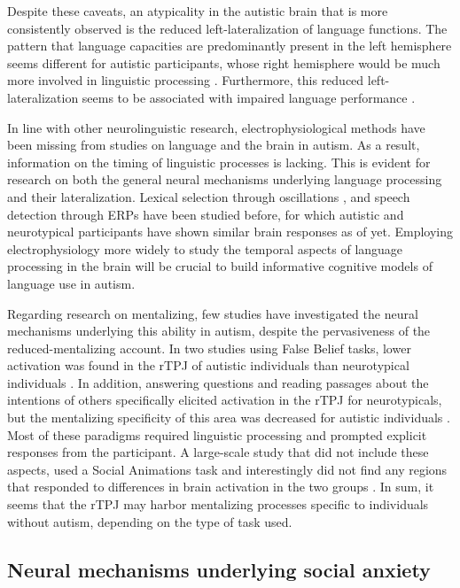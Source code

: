 Despite these caveats, an atypicality in the autistic brain that is more consistently observed is the reduced left-lateralization of language functions. The pattern that language capacities are predominantly present in the left hemisphere \citep{broca1865,szaflarski2006} seems different for autistic participants, whose right hemisphere would be much more involved in linguistic processing \citep{eyler2012,jouravlev2020,knaus2008,knaus2010}. Furthermore, this reduced left-lateralization seems to be associated with impaired language performance \citep{cermak2022,lindell2013}.

In line with other neurolinguistic research, electrophysiological methods have been missing from studies on language and the brain in autism. As a result, information on the timing of linguistic processes is lacking. This is evident for research on both the general neural mechanisms underlying language processing and their lateralization. Lexical selection through oscillations \citep{bloy2019}, and speech detection through ERPs \citep{kasai2005,oramcardy2005} have been studied before, for which autistic and neurotypical participants have shown similar brain responses as of yet. Employing electrophysiology more widely to study the temporal aspects of language processing in the brain will be crucial to build informative cognitive models of language use in autism. 

Regarding research on mentalizing, few studies have investigated the neural mechanisms underlying this ability in autism, despite the pervasiveness of the reduced-mentalizing account. In two studies using False Belief tasks, lower activation was found in the rTPJ of autistic individuals than neurotypical individuals \citep{nijhof2018,yuk2018}. In addition, answering questions and reading passages about the intentions of others specifically elicited activation in the rTPJ for neurotypicals, but the mentalizing specificity of this area was decreased for autistic individuals \citep{lombardo2011,mason2008}. Most of these paradigms required linguistic processing and prompted explicit responses from the participant. A large-scale study that did not include these aspects, used a Social Animations task and interestingly did not find any regions that responded to differences in brain activation in the two groups \citep{moessnang2020}. In sum, it seems that the rTPJ may harbor mentalizing processes specific to individuals without autism, depending on the type of task used.

\subsection*{Neural mechanisms underlying social anxiety}

